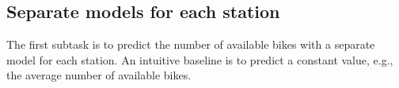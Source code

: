 \subsection{Separate models for each station}

The first subtask is to predict the number of available bikes with a separate
model for each station.
An intuitive baseline is to predict a constant value, e.g., the average number
of available bikes.
